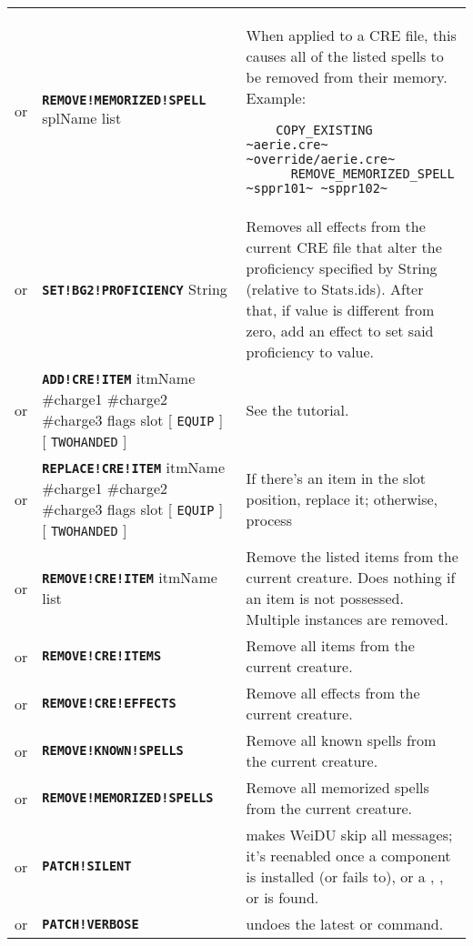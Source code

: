 \documentclass{article}
\def\ttref#1{\ahrefloc{#1}{\tt #1}}
\def\DEFINE#1{{\tt \bf #1}\label{#1}\index{#1}}
\def\DEFSYN#1{{\tt \bf #1}\index{#1}}
\def\t#1{{\tt #1}}
\def\Slist{{\color{red} list }}
\def\Ob{{\color{red} [ }}
\def\Oe{{\color{red} ] }}
\begin{document}
\begin{tabular}{cp{10in}|p{10in}}
or & \DEFINE{REMOVE!MEMORIZED!SPELL} splName \Slist &
  When applied to a CRE file, this \ttref{patch} causes all of the
  listed spells to be removed from their memory. Example:
\begin{verbatim}
    COPY_EXISTING ~aerie.cre~ ~override/aerie.cre~
      REMOVE_MEMORIZED_SPELL ~sppr101~ ~sppr102~
\end{verbatim}
 \\

or & \DEFINE{SET!BG2!PROFICIENCY} String \ttref{value} &
	Removes all effects from the current CRE file that alter the proficiency specified by
	String (relative to Stats.ids). After that, if value is different from zero, add an effect
	to set said proficiency to value. \\

or & \DEFSYN{ADD!CRE!ITEM} itmName \#charge1 \#charge2 \#charge3 flags slot \Ob
\t{EQUIP} \Oe \Ob \t{TWOHANDED} \Oe &
  See the \ttref{ADD!CRE!ITEM} tutorial. \\

or & \DEFINE{REPLACE!CRE!ITEM} itmName \#charge1 \#charge2 \#charge3 flags slot \Ob
\t{EQUIP} \Oe \Ob \t{TWOHANDED} \Oe &
  If there's an item in the slot position, replace it; otherwise, process \ttref{ADD!CRE!ITEM} \\

or & \DEFINE{REMOVE!CRE!ITEM} itmName \Slist &
  Remove the listed items from the current creature. Does nothing if an item is not possessed.
	Multiple instances are removed. \\

or & \DEFINE{REMOVE!CRE!ITEMS} &
  Remove all items from the current creature. \\
or & \DEFINE{REMOVE!CRE!EFFECTS} &
  Remove all effects from the current creature. \\
or & \DEFINE{REMOVE!KNOWN!SPELLS} &
  Remove all known spells from the current creature. \\
or & \DEFINE{REMOVE!MEMORIZED!SPELLS} &
  Remove all memorized spells from the current creature. \\
or & \DEFINE{PATCH!SILENT} & makes WeiDU skip all messages; it's reenabled once a component
    is installed (or fails to), or a \ttref{PRINT}, \ttref{PATCH!PRINT},
    \ttref{VERBOSE} or \ttref{PATCH!VERBOSE} is found. \\
or & \DEFINE{PATCH!VERBOSE} & undoes the latest \ttref{SILENT} or \ttref{PATCH!SILENT} command. \\


\end{tabular}
\end{document}
